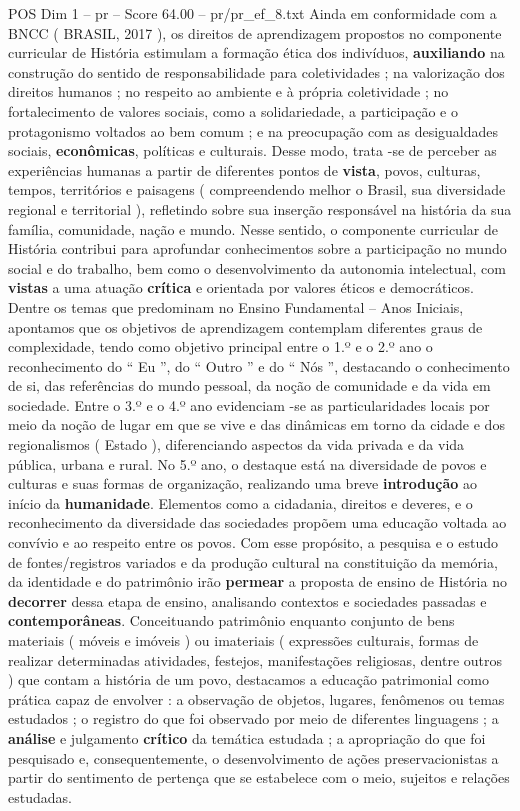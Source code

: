 \begin{textsample}{POS Dim 1 – pr – Score 64.00 – pr/pr\_ef\_8.txt}
Ainda em conformidade com a BNCC ( BRASIL, 2017 ), os direitos de aprendizagem propostos no componente curricular de História estimulam a formação ética dos indivíduos, \textbf{auxiliando} na construção do sentido de responsabilidade para coletividades ; na valorização dos direitos humanos ; no respeito ao ambiente e à própria coletividade ; no fortalecimento de valores sociais, como a solidariedade, a participação e o protagonismo voltados ao bem comum ; e na preocupação com as desigualdades sociais, \textbf{econômicas}, políticas e culturais.
Desse modo, trata -se de perceber as experiências humanas a partir de diferentes pontos de \textbf{vista}, povos, culturas, tempos, territórios e paisagens ( compreendendo melhor o Brasil, sua diversidade regional e territorial ), refletindo sobre sua inserção responsável na história da sua família, comunidade, nação e mundo.
Nesse sentido, o componente curricular de História contribui para aprofundar conhecimentos sobre a participação no mundo social e do trabalho, bem como o desenvolvimento da autonomia intelectual, com \textbf{vistas} a uma atuação \textbf{crítica} e orientada por valores éticos e democráticos.
Dentre os temas que predominam no Ensino Fundamental – Anos Iniciais, apontamos que os objetivos de aprendizagem contemplam diferentes graus de complexidade, tendo como objetivo principal entre o 1.º e o 2.º ano o reconhecimento do “ Eu ”, do “ Outro ” e do “ Nós ”, destacando o conhecimento de si, das referências do mundo pessoal, da noção de comunidade e da vida em sociedade.
Entre o 3.º e o 4.º ano evidenciam -se as particularidades locais por meio da noção de lugar em que se vive e das dinâmicas em torno da cidade e dos regionalismos ( Estado ), diferenciando aspectos da vida privada e da vida pública, urbana e rural.
No 5.º ano, o destaque está na diversidade de povos e culturas e suas formas de organização, realizando uma breve \textbf{introdução} ao início da \textbf{humanidade}.
Elementos como a cidadania, direitos e deveres, e o reconhecimento da diversidade das sociedades propõem uma educação voltada ao convívio e ao respeito entre os povos.
Com esse propósito, a pesquisa e o estudo de fontes/registros variados e da produção cultural na constituição da memória, da identidade e do patrimônio irão \textbf{permear} a proposta de ensino de História no \textbf{decorrer} dessa etapa de ensino, analisando contextos e sociedades passadas e \textbf{contemporâneas}.
Conceituando patrimônio enquanto conjunto de bens materiais ( móveis e imóveis ) ou imateriais ( expressões culturais, formas de realizar determinadas atividades, festejos, manifestações religiosas, dentre outros ) que contam a história de um povo, destacamos a educação patrimonial como prática capaz de envolver : a observação de objetos, lugares, fenômenos ou temas estudados ; o registro do que foi observado por meio de diferentes linguagens ; a \textbf{análise} e julgamento \textbf{crítico} da temática estudada ; a apropriação do que foi pesquisado e, consequentemente, o desenvolvimento de ações preservacionistas a partir do sentimento de pertença que se estabelece com o meio, sujeitos e relações estudadas.

\end{textsample}
